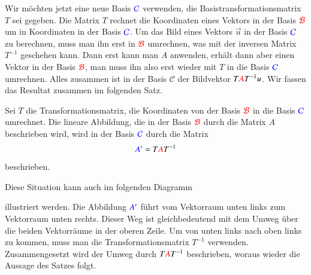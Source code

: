 Wir möchten jetzt eine neue Basis $\color{blue}\mathcal{C}$ verwenden, die
Basistransformationsmatrix $T$ sei gegeben.
Die Matrix $T$ rechnet die Koordinaten eines Vektors in der Basis
$\color{red}\mathcal{B}$ um in Koordinaten in der Basis
$\color{blue}\mathcal{C}$.
Um das Bild eines Vektors $\vec{u}$ in der Basis $\color{blue}\mathcal{C}$ 
zu berechnen, muss man ihn erst in $\color{red}\mathcal{B}$ umrechnen, was
mit der inversen Matrix $T^{-1}$ geschehen kann.
Dann erst kann man $A$ anwenden, erhält dann aber einen Vektor
in der Basis $\color{red}\mathcal{B}$, man muss ihn also erst wieder
mit $T$ in die Basis $\color{blue}\mathcal{C}$ umrechnen.
Alles zusammen ist in der Basis $\mathcal{C}$ der Bildvektor 
$T{\color{red}A}T^{-1}u$.
Wir fassen das Resultat zusammen im folgenden Satz.

\begin{satz}
\label{skript:affin:basiswechsel:satz}
Sei $T$ die Transformationsmatrix, die Koordinaten von der Basis
$\color{red}\mathcal{B}$ in die Basis $\color{blue}\mathcal{C}$ umrechnet.
Die lineare Abbildung, die in der Basis $\color{red}\mathcal{B}$ durch die
Matrix $A$ beschrieben wird, wird in der Basis $\color{blue}\mathcal{C}$ durch
die Matrix
\[
{\color{blue}A'}=T{\color{red}A}T^{-1}
\]
beschrieben.
\end{satz}

Diese Situation kann auch im folgenden Diagramm
\begin{center}
\end{center}
illustriert werden.
Die Abbildung $\color{blue}A'$ führt vom Vektorraum unten links zum
Vektorraum unten rechts.
Dieser Weg ist gleichbedeutend mit dem Umweg über die beiden Vektorräume
in der oberen Zeile.
Um von unten links nach oben links zu kommen, muss man die
Transformationsmatrix $T^{-1}$ verwenden.
Zusammengesetzt wird der Umweg durch $T{\color{red}A}T^{-1}$ beschrieben,
woraus wieder die Aussage des Satzes folgt.

